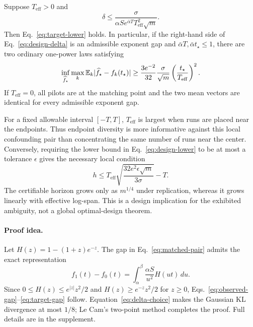 \begin{corollary}
\label{cor:design-span}
Suppose $T_{\mathrm{eff}}>0$ and
\begin{equation}
 \delta\le
 \frac{\sigma}{\alpha S e^{\bar\alpha T}T_{\mathrm{eff}}^2\sqrt m}.
 \label{eq:design-delta}
\end{equation}
Then Eq.~\eqref{eq:target-lower} holds. In particular, if the right-hand side of Eq.~\eqref{eq:design-delta} is an admissible exponent gap and
$\bar\alpha T,\bar\alpha t_\star\le1$, there are two ordinary one-power laws satisfying
\begin{equation}
 \inf_{\widehat f_\star}\max_k
 \mathbb{E}_k|\widehat f_\star-f_k(t_\star)|
 \ge \frac{3e^{-2}}{32}\frac{\sigma}{\sqrt m}
 \left(\frac{t_\star}{T_{\mathrm{eff}}}\right)^2.
 \label{eq:design-lower}
\end{equation}
If $T_{\mathrm{eff}}=0$, all pilots are at the matching point and the two mean vectors are identical for every admissible exponent gap.
\end{corollary}

For a fixed allowable interval $[-T,T]$, $T_{\mathrm{eff}}$ is largest when runs are placed near the endpoints. Thus endpoint diversity is more informative against this local confounding pair than concentrating the same number of runs near the center. Conversely, requiring the lower bound in Eq.~\eqref{eq:design-lower} to be at most a tolerance $\epsilon$ gives the necessary local condition
\begin{equation}
 h\le T_{\mathrm{eff}}
 \sqrt{\frac{32e^2\epsilon\sqrt m}{3\sigma}}-T.
 \label{eq:safe-horizon}
\end{equation}
The certifiable horizon grows only as $m^{1/4}$ under replication, whereas it grows linearly with effective log-span. This is a design implication for the exhibited ambiguity, not a global optimal-design theorem.

\paragraph{Proof idea.}
Let $H(z)=1-(1+z)e^{-z}$. The gap in Eq.~\eqref{eq:matched-pair} admits the exact representation
\begin{equation}
 f_1(t)-f_0(t)
 =\int_\alpha^\beta\frac{\alpha S}{u^2}H(ut)\,du.
 \label{eq:gap-integral}
\end{equation}
Since $0\le H(z)\le e^{|z|}z^2/2$ and $H(z)\ge e^{-z}z^2/2$ for $z\ge0$, Eqs.~\eqref{eq:observed-gap}--\eqref{eq:target-gap} follow. Equation~\eqref{eq:delta-choice} makes the Gaussian KL divergence at most $1/8$; Le Cam's two-point method completes the proof. Full details are in the supplement.
